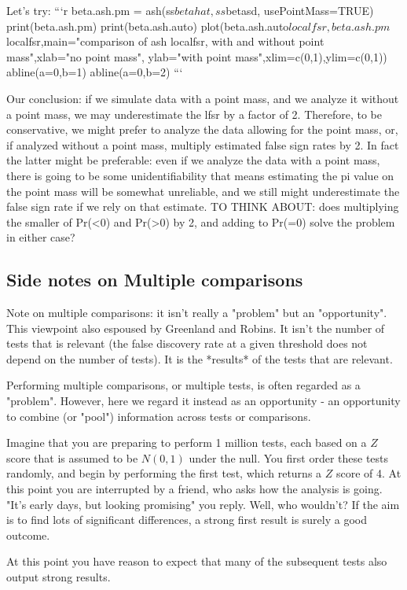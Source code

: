 \documentclass[10pt]{article}
\begin{document}
Let's try: 
```{r}
beta.ash.pm = ash(ss$betahat, ss$betasd, usePointMass=TRUE)
print(beta.ash.pm)
print(beta.ash.auto)
plot(beta.ash.auto$localfsr,beta.ash.pm$localfsr,main="comparison of ash localfsr, with and without point mass",xlab="no point mass", ylab="with point mass",xlim=c(0,1),ylim=c(0,1))
abline(a=0,b=1)
abline(a=0,b=2)
```

Our conclusion: if we simulate data with a point mass,
and we analyze it without a point mass, we may underestimate
the lfsr by a factor of 2. Therefore, to be conservative, we might prefer to analyze the data allowing for the point mass, or, if analyzed without a point mass, multiply estimated false sign rates by 2. In fact the latter might be preferable: even if we analyze the data with a point mass, there is going to be some unidentifiability
that means estimating the pi value on the point mass will be somewhat unreliable, and we still might underestimate the false sign rate if we rely on that estimate.  
TO THINK ABOUT: does multiplying the smaller of Pr(<0) and Pr(>0) by 2, and adding to Pr(=0) solve the problem in either case?


\subsection{Side notes on Multiple comparisons}

Note on multiple comparisons: it isn't really a "problem" but an "opportunity". This viewpoint also espoused by Greenland and Robins. It isn't the number of tests that is relevant (the false
discovery rate at a given threshold does not depend on the number of tests). It is the *results* of the tests that are relevant.

Performing multiple comparisons, or multiple tests, is often
regarded as a "problem". However, here we regard it instead as an opportunity - an opportunity to combine (or "pool") information across tests or comparisons.

Imagine that you are preparing to perform 1 million tests,
each based on a $Z$ score that is assumed to be $N(0,1)$ under the null.
You first order these tests randomly, and begin by 
performing the first test, which returns a $Z$ score of 4.
At this point you are interrupted by a friend, who asks how the analysis is going. "It's early days, but looking promising" you reply. Well, who wouldn't? If the aim is to find lots of significant differences, a strong first result is surely a good outcome. 

At this point you have reason to expect that many of the
subsequent tests also output strong results.
\end{document}
